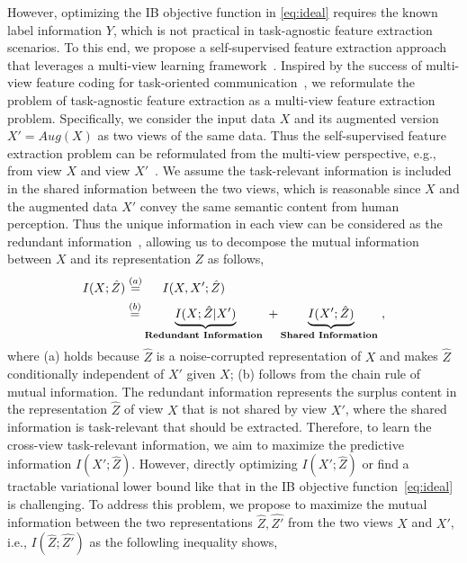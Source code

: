 However, optimizing the IB objective function in \eqref{eq:ideal} requires the known label information $Y$, which is not practical in task-agnostic feature extraction scenarios. To this end, we propose a self-supervised feature extraction approach that leverages a multi-view learning framework~\cite{chen2020simple,tsai2020self}. Inspired by the success of multi-view feature coding for task-oriented communication~\cite{shao2022task}, we reformulate the problem of task-agnostic feature extraction as a multi-view feature extraction problem. 
Specifically, we consider the input data $X$ and its augmented version $X' = Aug(X)$ as two views of the same data. Thus the self-supervised feature extraction problem can be reformulated from the multi-view perspective, e.g., from view $X$ and view $X'$~\cite{chen2020simple,federici2020learning}. We assume the task-relevant information is included in the shared information between the two views, which is reasonable since $X$ and the augmented data $X'$ convey the same semantic content from human perception. Thus the unique information in each view can be considered as the redundant information~\cite{federici2020learning}, allowing us to decompose the mutual information between $X$ and its representation $Z$ as follows,
\vspace{-0.1cm}
\begin{equation}
        \label{eq:redundancy}
        \begin{aligned}
        I(X ; \hat{Z})&\overset{(a)}{=}\ \ \ \ I(X,X';\hat{Z})\\
        &\overset{(b)}{=}\underbrace{I(X ; \hat{Z}| X')}_{\text {\textbf{Redundant Information }}}+\underbrace{I(X' ; \hat{Z})}_{\text {\textbf{Shared Information }}},
        \end{aligned}
    \end{equation}
where (a) holds because $\hat{Z}$ is a noise-corrupted representation of $X$ and makes $\hat{Z}$ conditionally independent of $X'$ given $X$; (b) follows from the chain rule of mutual information.
The redundant information represents the surplus content in the representation $\hat{Z}$ of view $X$ that is not shared by view $X'$, where the shared information is task-relevant that should be extracted. Therefore, to learn the cross-view task-relevant information, we aim to maximize the predictive information $I(X' ; \hat{Z})$. However, directly optimizing $I(X';\hat{Z})$ or find a tractable variational lower bound like that in the IB objective function~\eqref{eq:ideal} is challenging. To address this problem, we propose to maximize the mutual information between the two representations $\hat{Z},\hat{Z'}$ from the two views $X$ and $X'$, i.e., $I(\hat{Z};\hat{Z'})$ as the followling inequality shows,

